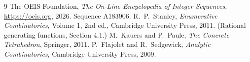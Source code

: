 \documentclass[11pt,a4paper]{article}
\theoremstyle{plain}
\theoremstyle{definition}
\begin{document}
\begin{thebibliography}{9}
 The OEIS Foundation, \emph{The On-Line Encyclopedia of Integer
Sequences}, \url{https://oeis.org}, 2026. Sequence A183906.
 R.~P.~Stanley, \emph{Enumerative Combinatorics}, Volume 1, 2nd ed.,
Cambridge University Press, 2011. (Rational generating functions, Section 4.1.)
 M.~Kauers and P.~Paule, \emph{The Concrete Tetrahedron}, Springer, 2011.
 P.~Flajolet and R.~Sedgewick, \emph{Analytic Combinatorics}, Cambridge
University Press, 2009.
\end{thebibliography}
\end{document}
